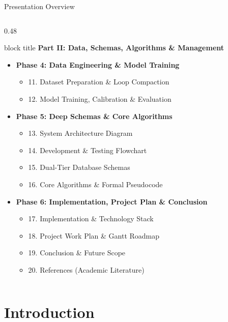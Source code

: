 \documentclass[aspectratio=169,10pt]{beamer}
\begin{document}
\begin{frame}{Presentation Overview}
\begin{columns}[T]
\begin{column}{0.48\textwidth}
\begin{beamercolorbox}[rounded=true,shadow=false,sep=0.35em,wd=\textwidth]{block title}
\textbf{\scriptsize Part II: Data, Schemas, Algorithms \& Management}
\end{beamercolorbox}
\vspace{0.20em}
{\fontsize{6.5pt}{8.3pt}\selectfont
\begin{itemize}\itemsep0.18em
  \item \textbf{Phase 4: Data Engineering \& Model Training}
  \begin{itemize}\itemsep0.10em
    \item 11. Dataset Preparation \& Loop Compaction
    \item 12. Model Training, Calibration \& Evaluation
  \end{itemize}
  \item \textbf{Phase 5: Deep Schemas \& Core Algorithms}
  \begin{itemize}\itemsep0.10em
    \item 13. System Architecture Diagram
    \item 14. Development \& Testing Flowchart
    \item 15. Dual-Tier Database Schemas
    \item 16. Core Algorithms \& Formal Pseudocode
  \end{itemize}
  \item \textbf{Phase 6: Implementation, Project Plan \& Conclusion}
  \begin{itemize}\itemsep0.10em
    \item 17. Implementation \& Technology Stack
    \item 18. Project Work Plan \& Gantt Roadmap
    \item 19. Conclusion \& Future Scope
    \item 20. References (Academic Literature)
  \end{itemize}
\end{itemize}
}
\end{column}
\end{columns}
\end{frame}

\section{Introduction}
\end{document}
